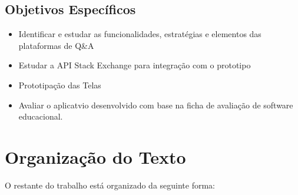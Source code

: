 \subsection{Objetivos Específicos}
\begin{itemize}
	\item Identificar e estudar as funcionalidades, estratégias e elementos das plataformas de Q\&A
	\item Estudar a API Stack Exchange para integração com o prototipo
	\item Prototipação das Telas
	\item Avaliar o aplicatvio desenvolvido com base na ficha de avaliação de software educacional.
	
\end{itemize}


\section{Organização do Texto}%

O restante do trabalho está organizado da seguinte forma:







